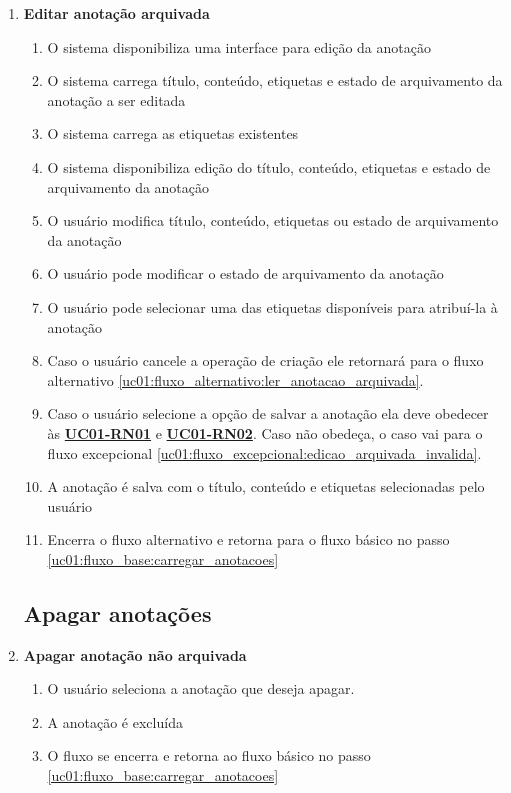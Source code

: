\documentclass[
	12pt,				%
	oneside,			%
	a4paper,			%
	english,			%
	brazil,				%
	]{abntex2}
\begin{document}
\begin{enumerate}[label=\textbf{UC01-FA{\arabic*}},font=\normalsize]
    \item \textbf{\normalsize Editar anotação arquivada} \label{uc01:fluxo_alternativo:editar_anotacao_arquivada}
    \begin{enumerate}[label={\arabic*}.]
        \item O sistema disponibiliza uma interface para edição da anotação
        \item O sistema carrega título, conteúdo, etiquetas e estado de arquivamento da anotação a ser editada
        \item O sistema carrega as etiquetas existentes
        \item O sistema disponibiliza edição do título, conteúdo, etiquetas e estado de arquivamento da anotação
        \item O usuário modifica título, conteúdo, etiquetas ou estado de arquivamento da anotação \label{uc01:fluxo_alternativo:editar_anotacao_arquivada:pode_escrever}
        \item O usuário pode modificar o estado de arquivamento da anotação
        \item O usuário pode selecionar uma das etiquetas disponíveis para atribuí-la à anotação
        \item Caso o usuário cancele a operação de criação ele retornará para o fluxo alternativo \ref{uc01:fluxo_alternativo:ler_anotacao_arquivada}.
        \item Caso o usuário selecione a opção de salvar a anotação ela deve obedecer às \textbf{\hyperref[uc01:rn01_validacao_anotacao]{UC01-RN01}} e \textbf{\hyperref[uc01:rn02_flag_arquivar]{UC01-RN02}}. Caso não obedeça, o caso vai para o fluxo excepcional \ref{uc01:fluxo_excepcional:edicao_arquivada_invalida}.
        \item A anotação é salva com o título, conteúdo e etiquetas selecionadas pelo usuário
        \item Encerra o fluxo alternativo e retorna para o fluxo básico no passo \ref{uc01:fluxo_base:carregar_anotacoes}
    \end{enumerate}
    
    \subsection{Apagar anotações}
    \item \textbf{\normalsize Apagar anotação não arquivada} \label{uc01:fluxo_alternativo:apagar_anotacao_nao_arquivada}
    \begin{enumerate}[label={\arabic*}.]
        \item O usuário seleciona a anotação que deseja apagar.
        \item A anotação é excluída
        \item O fluxo se encerra e retorna ao fluxo básico no passo \ref{uc01:fluxo_base:carregar_anotacoes}
    \end{enumerate}


\end{enumerate}
\end{document}
